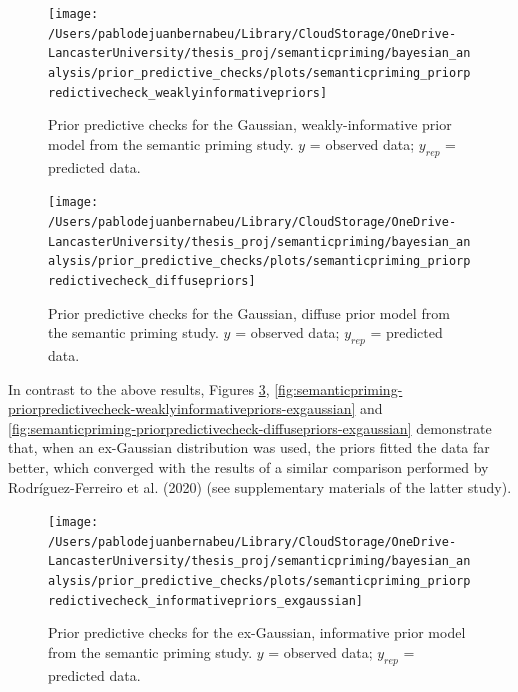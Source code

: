 \documentclass[
  12pt,
  man,floatsintext]{apa7}
\begin{document}
\begin{figure}

{\centering \texttt{[image: /Users/pablodejuanbernabeu/Library/CloudStorage/OneDrive-LancasterUniversity/thesis\_proj/semanticpriming/bayesian\_analysis/prior\_predictive\_checks/plots/semanticpriming\_priorpredictivecheck\_weaklyinformativepriors]} 

}

\caption{Prior predictive checks for the Gaussian, weakly-informative prior model from the semantic priming study. \(y\) = observed data; \(y_{rep}\) = predicted data.}\label{fig:semanticpriming-priorpredictivecheck-weaklyinformativepriors}
\end{figure}



\begin{figure}

{\centering \texttt{[image: /Users/pablodejuanbernabeu/Library/CloudStorage/OneDrive-LancasterUniversity/thesis\_proj/semanticpriming/bayesian\_analysis/prior\_predictive\_checks/plots/semanticpriming\_priorpredictivecheck\_diffusepriors]} 

}

\caption{Prior predictive checks for the Gaussian, diffuse prior model from the semantic priming study. \(y\) = observed data; \(y_{rep}\) = predicted data.}\label{fig:semanticpriming-priorpredictivecheck-diffusepriors}
\end{figure}

In contrast to the above results, Figures \ref{fig:semanticpriming-priorpredictivecheck-informativepriors-exgaussian}, \ref{fig:semanticpriming-priorpredictivecheck-weaklyinformativepriors-exgaussian} and \ref{fig:semanticpriming-priorpredictivecheck-diffusepriors-exgaussian} demonstrate that, when an ex-Gaussian distribution was used, the priors fitted the data far better, which converged with the results of a similar comparison performed by Rodríguez-Ferreiro et al. (2020) (see supplementary materials of the latter study).



\begin{figure}

{\centering \texttt{[image: /Users/pablodejuanbernabeu/Library/CloudStorage/OneDrive-LancasterUniversity/thesis\_proj/semanticpriming/bayesian\_analysis/prior\_predictive\_checks/plots/semanticpriming\_priorpredictivecheck\_informativepriors\_exgaussian]} 

}

\caption{Prior predictive checks for the ex-Gaussian, informative prior model from the semantic priming study. \(y\) = observed data; \(y_{rep}\) = predicted data.}\label{fig:semanticpriming-priorpredictivecheck-informativepriors-exgaussian}
\end{figure}
\end{document}
